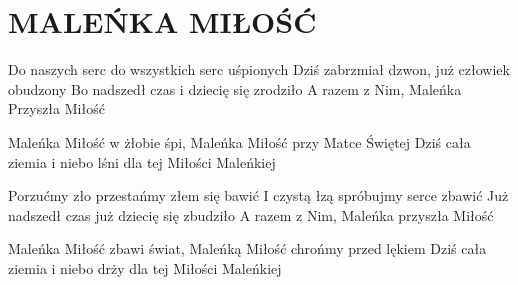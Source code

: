 \documentclass[../../../songbook.tex]{subfiles}
\begin{document}
\TabPositions{8cm} %
\section*{MALEŃKA MIŁOŚĆ}
{}
\vspace{0.5cm}
Do naszych serc do wszystkich serc uśpionych	 \newline
Dziś zabrzmiał dzwon, już człowiek obudzony		 \newline
Bo nadszedł czas i dziecię się zrodziło			 \newline
A razem z Nim, Maleńka Przyszła Miłość			 \newline

\-\hspace{1cm} Maleńka Miłość w żłobie śpi,		 \newline
\-\hspace{1cm} Maleńka Miłość przy Matce Świętej	 \newline
\-\hspace{1cm} Dziś cała ziemia i niebo lśni		 \newline
\-\hspace{1cm} dla tej Miłości Maleńkiej			 \newline

Porzućmy zło przestańmy złem się bawić \newline
I czystą łzą spróbujmy serce zbawić \newline
Już nadszedł czas już dziecię się zbudziło \newline
A razem z Nim, Maleńka przyszła Miłość  \newline

\-\hspace{1cm} Maleńka Miłość zbawi świat, \newline
\-\hspace{1cm} Maleńką Miłość chrońmy przed lękiem \newline
\-\hspace{1cm} Dziś cała ziemia i niebo drży \newline
\-\hspace{1cm} dla tej Miłości Maleńkiej \newline
\end{document}
